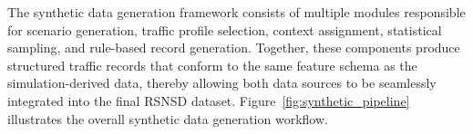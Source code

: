 \documentclass[12pt,a4paper]{report}
\begin{document}
	The synthetic data generation framework consists of multiple modules responsible for scenario generation, traffic profile selection, context assignment, statistical sampling, and rule-based record generation. Together, these components produce structured traffic records that conform to the same feature schema as the simulation-derived data, thereby allowing both data sources to be seamlessly integrated into the final RSNSD dataset. Figure~\ref{fig:synthetic_pipeline} illustrates the overall synthetic data generation workflow.
	

	
\end{document}
